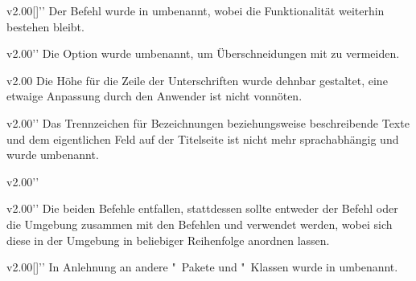 \begin{Obsolete}{v2.00}{[]}''%
\printdeclarationlist%
%
Der Befehl  wurde in  umbenannt, wobei die 
Funktionalität weiterhin bestehen bleibt.
\end{Obsolete}

\begin{Obsolete}{v2.00}{}''
\printdeclarationlist%
%
Die Option wurde umbenannt, um Überschneidungen mit  zu 
vermeiden.
\end{Obsolete}

\begin{Obsolete}{v2.00}{}
\printdeclarationlist%
%
Die Höhe für die Zeile der Unterschriften wurde dehnbar gestaltet, eine etwaige 
Anpassung durch den Anwender ist nicht vonnöten.
\end{Obsolete}

\begin{Obsolete}{v2.00}{}''
\printdeclarationlist%
%
Das Trennzeichen für Bezeichnungen beziehungsweise beschreibende Texte und dem 
eigentlichen Feld auf der Titelseite ist nicht mehr sprachabhängig und wurde 
umbenannt.
\end{Obsolete}

\begin{Obsolete}{v2.00}{}''
\begin{Obsolete}{v2.00}{}''
\printdeclarationlist%
%
Die beiden Befehle entfallen, stattdessen sollte entweder der Befehl 
 oder die Umgebung  zusammen mit 
den Befehlen  und  verwendet werden, 
wobei sich diese in der Umgebung in beliebiger Reihenfolge anordnen lassen.
\end{Obsolete}
\end{Obsolete}

\begin{Obsolete}{v2.00}{[]}''
\printdeclarationlist%
%
In Anlehnung an andere "~Pakete und "~Klassen wurde 
 in  umbenannt.
\end{Obsolete}

